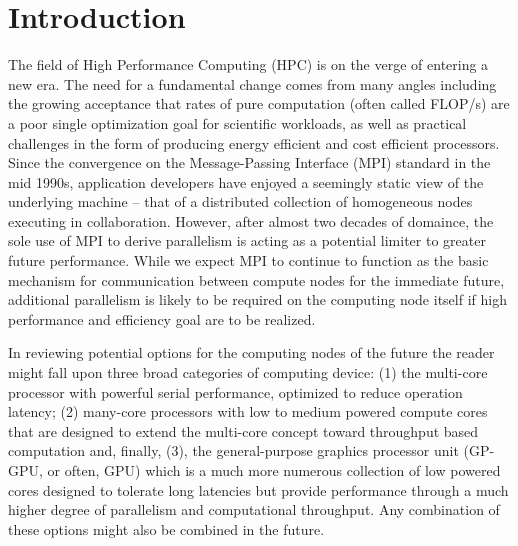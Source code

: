 

\chapter{Introduction}
\label{C:intro}

\noindent
The field of High Performance Computing (HPC) is on the verge of entering a new era. The need
for a fundamental change comes from many angles including the growing acceptance that rates of
pure computation (often called FLOP/s) are a poor single optimization goal for scientific
workloads, as well as practical challenges in the form of producing energy efficient and cost
efficient processors. Since the convergence on the Message-Passing Interface (MPI) standard
in the mid 1990s, application developers have enjoyed a seemingly static view of the 
underlying machine --
that of a distributed collection of homogeneous nodes executing in collaboration. However, 
after almost two decades of domaince, the sole use of MPI to derive parallelism is acting as
a potential limiter to greater future performance. While we expect MPI to continue to function
as the basic mechanism for communication between compute nodes for the immediate future, 
additional parallelism is
likely to be required on the computing node itself if high performance and efficiency goal 
are to be realized.

In reviewing potential options for the computing nodes of the future the reader might fall
upon three broad categories of computing device: (1) the multi-core processor with powerful
serial performance, optimized to reduce operation latency; (2) many-core processors with
low to medium powered compute cores that are designed to extend the multi-core concept toward
throughput based computation and, finally, (3), the general-purpose graphics processor unit
(GP-GPU, or often, GPU) which is a much more numerous collection of low powered cores designed
to tolerate long latencies but provide performance through a much higher degree of 
parallelism and computational throughput. Any combination of these options might also be 
combined in the future.

